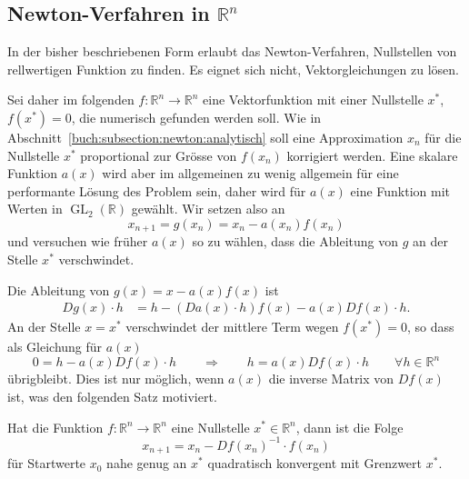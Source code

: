 \subsection{Newton-Verfahren in $\mathbb R^n$}
In der bisher beschriebenen Form erlaubt das Newton-Verfahren, 
Nullstellen von rellwertigen Funktion zu finden.
Es eignet sich nicht, Vektorgleichungen zu lösen.

Sei daher im folgenden $f\colon \mathbb R^n \to \mathbb R^n$ eine
Vektorfunktion mit einer Nullstelle $x^*$, $f(x^*)=0$, die numerisch gefunden 
werden soll.
Wie in Abschnitt~\ref{buch:subsection:newton:analytisch} soll eine
Approximation $x_n$ für die Nullstelle $x^*$ proportional zur Grösse
von $f(x_n)$ korrigiert werden.
Eine skalare Funktion $a(x)$ wird aber im allgemeinen zu wenig
allgemein für eine performante Lösung des Problem sein, daher
wird für $a(x)$ eine Funktion mit Werten in $\operatorname{GL}_2(\mathbb R)$
gewählt.
Wir setzen also an
\[
x_{n+1} = g(x_n) = x_n - a(x_n) f(x_n)
\]
und versuchen wie früher $a(x)$ so zu wählen, dass die Ableitung von $g$
an der Stelle $x^*$ verschwindet.

Die Ableitung von $g(x)=x-a(x)f(x)$ ist
\begin{align*}
Dg(x) \cdot h
&=
h - (Da(x)\cdot h) f(x) - a(x) Df(x)\cdot h.
\end{align*}
An der Stelle $x=x^*$ verschwindet der mittlere Term wegen $f(x^*)=0$, so
dass als Gleichung für $a(x)$
\[
0=h-a(x) Df(x) \cdot h
\qquad\Rightarrow\qquad
h = a(x) Df(x) \cdot h\qquad \forall h\in\mathbb R^n
\]
übrigbleibt.
Dies ist nur möglich, wenn $a(x)$ die inverse Matrix von $Df(x)$ ist,
was den folgenden Satz motiviert.

\begin{satz}
Hat die Funktion $f\colon\mathbb R^n\to\mathbb R^n$ eine Nullstelle
$x^*\in\mathbb R^n$, dann ist die Folge 
\[
x_{n+1} = x_n - Df(x_n)^{-1}\cdot f(x_n)
\]
für Startwerte $x_0$ nahe genug an $x^*$ quadratisch konvergent mit
Grenzwert $x^*$.
\end{satz}

